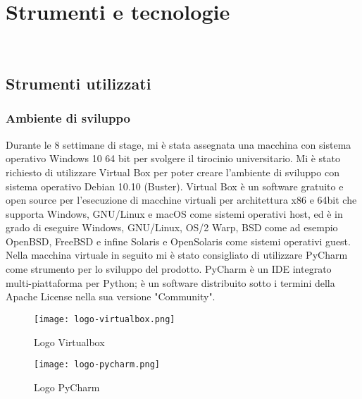 
\chapter{Strumenti e tecnologie}
\label{cap:strumenti-e-tecnologie}

\\

\section{Strumenti utilizzati}

\subsection{Ambiente di sviluppo}
Durante le 8 settimane di stage, mi è stata assegnata una macchina con sistema operativo Windows 10 64 bit per svolgere il tirocinio universitario. Mi è stato richiesto di utilizzare Virtual Box per poter creare l'ambiente di sviluppo con sistema operativo Debian 10.10 (Buster). \newline{} Virtual Box è un software gratuito e open source per l'esecuzione di macchine virtuali per architettura x86 e 64bit che supporta Windows, GNU/Linux e macOS come sistemi operativi host, ed è in grado di eseguire Windows, GNU/Linux, OS/2 Warp, BSD come ad esempio OpenBSD, FreeBSD e infine Solaris e OpenSolaris come sistemi operativi guest.\newline{}
Nella macchina virtuale in seguito mi è stato consigliato di utilizzare PyCharm come strumento per lo sviluppo del prodotto.\newline{}
PyCharm è un IDE integrato multi-piattaforma per Python; è un software distribuito sotto i termini della Apache License nella sua versione "Community".
\begin{figure}[!h]
    \begin{minipage}{.5\textwidth} 
        \centering 
        \texttt{[image: logo-virtualbox.png]} 
        \caption{Logo Virtualbox} 
        \label{fig:virtualbox} 
    \end{minipage}%
    \begin{minipage}{.5\textwidth} 
        \centering 
        \texttt{[image: logo-pycharm.png]} 
        \caption{Logo PyCharm} 
        \label{fig:pycharm} 
    \end{minipage}  
\end{figure}

